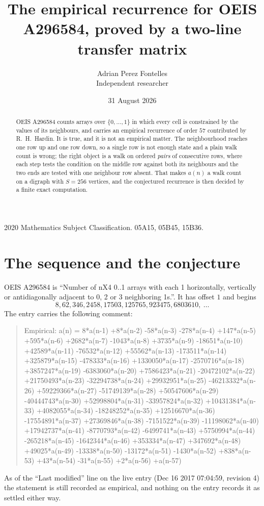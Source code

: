 \documentclass[11pt,a4paper]{article}
\title{The empirical recurrence for OEIS A296584, proved by a two-line transfer matrix}
\author{Adrian Perez Fontelles\\ \small Independent researcher}
\date{31 August 2026}
\theoremstyle{plain}
\theoremstyle{definition}
\begin{document}
\maketitle

\begin{abstract}
OEIS A296584 counts arrays over $\{0,\dots,1\}$ in which every cell is constrained by the
values of its neighbours, and carries an empirical recurrence of order $57$ contributed
by R.~H.~Hardin. It is true, and it is not an empirical matter. The neighbourhood reaches one
row up and one row down, so a single row is not enough state and a plain walk count
is wrong; the right object is a walk on ordered \emph{pairs} of consecutive rows, where
each step tests the condition on the middle row against both its neighbours and the two
ends are tested with one neighbour row absent. That makes $a(n)$ a walk count on a digraph
with $S=256$ vertices, and the conjectured recurrence is then decided by a finite exact
computation.
\end{abstract}

\noindent\small 2020 Mathematics Subject Classification. 05A15, 05B45, 15B36.\normalsize

\section{The sequence and the conjecture}

OEIS A296584 is ``Number of nX4 0..1 arrays with each 1 horizontally, vertically or antidiagonally adjacent to 0, 2 or 3 neighboring 1s.''. It has offset $1$ and begins
\[
8, 62, 346, 2458, 17503, 125765, 923475, 6803610,\ \dots
\]
The entry carries the following comment:
\begin{quote}\small
Empirical: a(n) = 8*a(n-1) +8*a(n-2) -58*a(n-3) -278*a(n-4) +147*a(n-5) +595*a(n-6) +2682*a(n-7) -1043*a(n-8) +3735*a(n-9) -18651*a(n-10) +42589*a(n-11) -76532*a(n-12) +55562*a(n-13) -173511*a(n-14) +325879*a(n-15) -478333*a(n-16) +1330050*a(n-17) -2570716*a(n-18) +3857247*a(n-19) -6383060*a(n-20) +7586423*a(n-21) -20472102*a(n-22) +21750493*a(n-23) -32294738*a(n-24) +29932951*a(n-25) -46213332*a(n-26) +59229366*a(n-27) -51749139*a(n-28) +50547606*a(n-29) -40444743*a(n-30) +52998804*a(n-31) -33957824*a(n-32) +10431384*a(n-33) +4082055*a(n-34) -18248252*a(n-35) +12516670*a(n-36) -17554891*a(n-37) +27369846*a(n-38) -7151522*a(n-39) -11198062*a(n-40) +17942737*a(n-41) -8770793*a(n-42) -6499741*a(n-43) +5750994*a(n-44) -265218*a(n-45) -1642344*a(n-46) +353334*a(n-47) +347692*a(n-48) +49025*a(n-49) -13338*a(n-50) -13172*a(n-51) -1430*a(n-52) +838*a(n-53) +43*a(n-54) -31*a(n-55) +2*a(n-56) +a(n-57)
\end{quote}
As of the ``Last modified'' line on the live entry (Dec 16 2017 07:04:59, revision 4) the statement is
still recorded as empirical, and nothing on the entry records it as settled either way.
\end{document}
